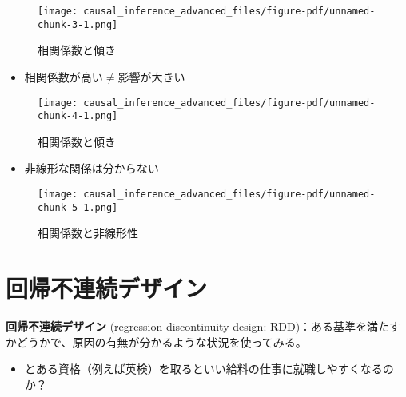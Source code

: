 \documentclass[
  xelatex,
  ja=standard]{bxjsarticle}
\providecommand{\tightlist}{%
  \setlength{\itemsep}{0pt}\setlength{\parskip}{0pt}}\usepackage{longtable,booktabs,array}
\begin{document}
\begin{figure}[htpb]

{\centering \texttt{[image: causal\_inference\_advanced\_files/figure-pdf/unnamed-chunk-3-1.png]}

}

\caption{相関係数と傾き}

\end{figure}

\begin{itemize}
\tightlist
\item
  相関係数が高い\(\neq\)影響が大きい
\end{itemize}

\begin{figure}[htpb]

{\centering \texttt{[image: causal\_inference\_advanced\_files/figure-pdf/unnamed-chunk-4-1.png]}

}

\caption{相関係数と傾き}

\end{figure}

\begin{itemize}
\tightlist
\item
  非線形な関係は分からない
\end{itemize}

\begin{figure}[htpb]

{\centering \texttt{[image: causal\_inference\_advanced\_files/figure-pdf/unnamed-chunk-5-1.png]}

}

\caption{相関係数と非線形性}

\end{figure}

\hypertarget{ux56deux5e30ux4e0dux9023ux7d9aux30c7ux30b6ux30a4ux30f3}{%
\section{回帰不連続デザイン}\label{ux56deux5e30ux4e0dux9023ux7d9aux30c7ux30b6ux30a4ux30f3}}

\textbf{回帰不連続デザイン} (regression discontinuity design:
RDD)：ある基準を満たすかどうかで、原因の有無が分かるような状況を使ってみる。

\begin{itemize}
\tightlist
\item
  とある資格（例えば英検）を取るといい給料の仕事に就職しやすくなるのか？
\end{itemize}
\end{document}
